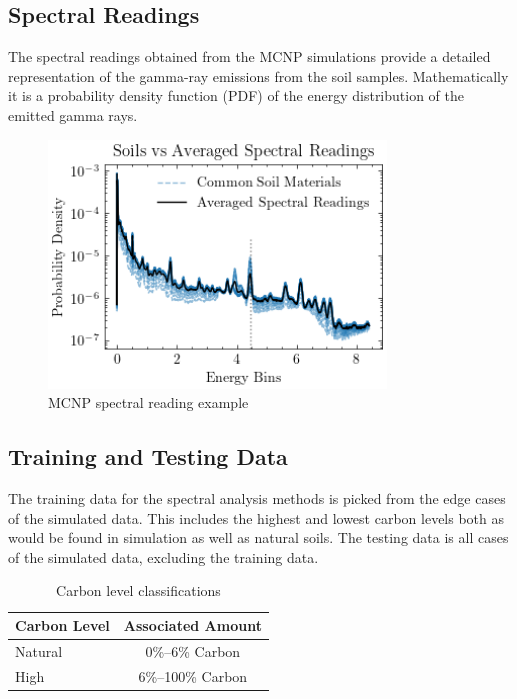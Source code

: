 \documentclass[review]{elsarticle}
\begin{document}
\subsection{Spectral Readings}

The spectral readings obtained from the MCNP simulations provide a detailed representation of the gamma-ray emissions from the soil samples. Mathematically it is a probability density function (PDF) of the energy distribution of the emitted gamma rays.

\begin{figure}[H]
\centering
\includegraphics[width=0.8\textwidth]{../Figures/DataGeneration/MCNPSpectralReading.png}
\caption{MCNP spectral reading example}
\label{fig:mcnp_spectral}
\end{figure}

\subsection{Training and Testing Data}

The training data for the spectral analysis methods is picked from the edge cases of the simulated data. This includes the highest and lowest carbon levels both as would be found in simulation as well as natural soils. The testing data is all cases of the simulated data, excluding the training data.

\begin{table}[H]
\centering
\caption{Carbon level classifications}
\label{tab:carbon_levels}
\begin{tabular}{@{}lc@{}}
\toprule
Carbon Level & Associated Amount \\
\midrule
Natural & 0\%--6\% Carbon \\
High & 6\%--100\% Carbon \\
\bottomrule
\end{tabular}
\end{table}
\end{document}
